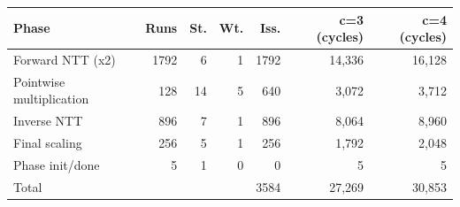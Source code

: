 \begin{tabular}{@{}lrrrrrr@{}}
\toprule
Phase & Runs & St. & Wt. & Iss. & c=3 (cycles) & c=4 (cycles) \\
\midrule
Forward NTT (x2) & 1792 & 6 & 1 & 1792 & 14,336 & 16,128 \\
Pointwise multiplication & 128 & 14 & 5 & 640 & 3,072 & 3,712 \\
Inverse NTT & 896 & 7 & 1 & 896 & 8,064 & 8,960 \\
Final scaling & 256 & 5 & 1 & 256 & 1,792 & 2,048 \\
Phase init/done & 5 & 1 & 0 & 0 & 5 & 5 \\
Total &  &  &  & 3584 & 27,269 & 30,853 \\
\bottomrule
\end{tabular}
